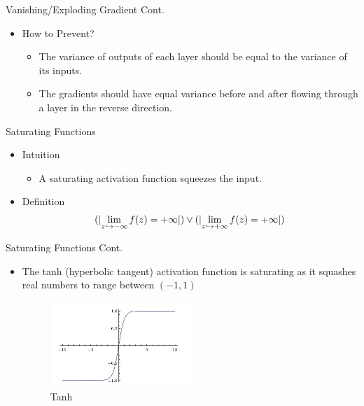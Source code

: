 \begin{frame}{Vanishing/Exploding Gradient Cont.}
    \begin{itemize}
        \item How to Prevent? 
        \begin{itemize}
            \item The variance of outputs of each layer should be equal to the variance of its inputs.
            \item The gradients should have equal variance before and after flowing through a layer in the reverse direction.
        \end{itemize}
    \end{itemize}
\end{frame}

\DeclarePairedDelimiter\abs{\lvert}{\rvert}%
\begin{frame}{Saturating Functions}
    \begin{itemize}
        \item Intuition
        \begin{itemize}
            \item A saturating activation function squeezes the input.
        \end{itemize}
        \item Definition
        \begin{align*}
            (\abs{\lim_{z\hookrightarrow -\infty}f(z)=+\infty})
            \vee (\abs{\lim_{z\hookrightarrow +\infty}f(z)=+\infty})
        \end{align*}
        
    \end{itemize}
\end{frame}

\begin{frame}{Saturating Functions Cont.}
    \begin{itemize}
            \item The tanh (hyperbolic tangent) activation function is saturating as it squashes real numbers to range between $(-1, 1)$
            \begin{figure}[H]
    		     \centering
    		     \includegraphics[width=0.5\textwidth]{Figs/tanh.png}
    		     \caption{Tanh}
	        \end{figure}
    \end{itemize}
\end{frame}

